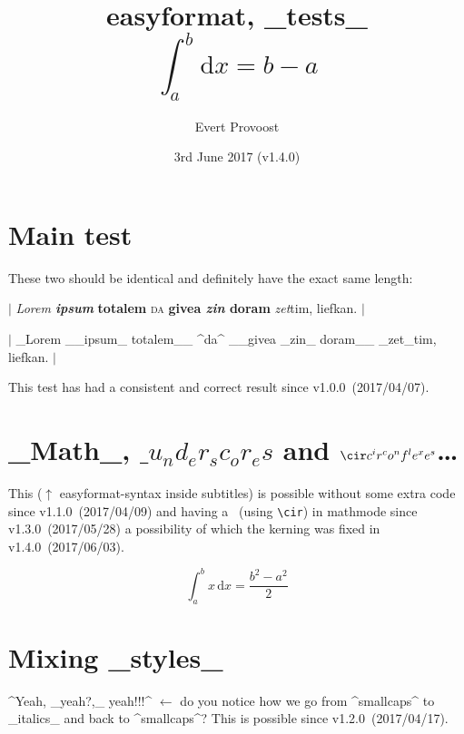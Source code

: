 \documentclass[11pt]{article}
\title{\textsf{easyformat}, _tests_\\$$ \int_a^b \mathrm{d}x = b - a $$}
\author{Evert Provoost}
\date{3rd June 2017 (v1.4.0)}
\begin{document}
	\maketitle
	\tableofcontents

	\section{Main test}
	These two should be identical and definitely have the exact same length:

	$|$ \textit{Lorem \textbf{ipsum}}\textbf{ totalem} \textsc{da} \textbf{givea \textit{zin} doram}
	\textit{zet}tim, liefkan. $|$

	$|$ _Lorem __ipsum_ totalem__ ^da^ __givea _zin_ doram__ _zet_tim, liefkan. $|$
	
	\noindent This test has had a consistent and correct result since v1.0.0~(2017/04/07).

	\section{_Math_, $\_ u_nd_er_sc_or_es$ and $\cir c^ir^co^nf^le^xe^s$\dots}
	This ($\uparrow$ \textsf{easyformat}-syntax inside subtitles) is possible without some extra code
	since v1.1.0~(2017/04/09) and having a \cir\ (using \verb|\cir|) in mathmode since
	v1.3.0~(2017/05/28) a possibility of which the kerning was fixed in v1.4.0~(2017/06/03).
	
	$$ \int_a^b x\,\mathrm{d}x = \frac{b^2 - a^2}{2} $$
	
	\section{Mixing _styles_}
	^Yeah, _yeah?,_ yeah!!!^
	$\leftarrow$ do you notice how we go from ^smallcaps^ to _italics_ and back to ^smallcaps^? This
	is possible since v1.2.0~(2017/04/17).
\end{document}
